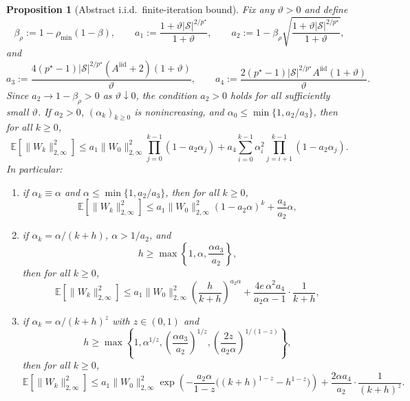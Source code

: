 \documentclass{article}
\newtheorem{proposition}[theorem]{Proposition}
\newcommand{\X}{\mathcal{S}}
\begin{document}
\begin{proposition}[Abstract i.i.d.\ finite-iteration bound]
\label{prop:abstract-iid}
Fix any $\vartheta > 0$ and define
\begin{equation}
\beta_{\rho} := 1 - \rho_{\min}(1-\beta), \qquad a_1 := \frac{1 + \vartheta \lvert \X \rvert^{2/p^\star}}{1+\vartheta}, \qquad a_2 := 1 - \beta_{\rho}\sqrt{\frac{1 + \vartheta \lvert \X \rvert^{2/p^\star}}{1+\vartheta}},
\end{equation}
and
\begin{equation}
a_3 := \frac{4(p^\star-1)\lvert \X \rvert^{2/p^\star}(A^{\mathrm{iid}}+2)(1+\vartheta)}{\vartheta}, \qquad a_4 := \frac{2(p^\star-1)\lvert \X \rvert^{2/p^\star}A^{\mathrm{iid}}(1+\vartheta)}{\vartheta}.
\end{equation}
Since $a_2 \to 1-\beta_{\rho}>0$ as $\vartheta\downarrow 0$, the condition $a_2 >0$ holds for all sufficiently small $\vartheta$. If $a_2 > 0$, $(\alpha_k)_{k \ge 0}$ is nonincreasing, and $\alpha_0 \le \min\{1,a_2/a_3\}$, then for all $k \ge 0$,
\begin{equation}
\mathbb{E}\left[\lVert W_k \rVert_{2,\infty}^2\right] \le a_1 \lVert W_0 \rVert_{2,\infty}^2 \prod_{j=0}^{k-1}(1-a_2\alpha_j) + a_4 \sum_{i=0}^{k-1} \alpha_i^2 \prod_{j=i+1}^{k-1}(1-a_2\alpha_j).
\end{equation}
In particular:
\begin{enumerate}
\item if $\alpha_k \equiv \alpha$ and $\alpha \le \min\{1,a_2/a_3\}$, then for all $k \ge 0$,
\begin{equation}
\mathbb{E}\left[\lVert W_k \rVert_{2,\infty}^2\right] \le a_1 \lVert W_0 \rVert_{2,\infty}^2 (1-a_2\alpha)^k + \frac{a_4}{a_2}\alpha,
\end{equation}

\item if $\alpha_k = \alpha/(k+h)$, $\alpha > 1/a_2$, and
\begin{equation}
h \ge \max\left\{1,\alpha,\frac{\alpha a_3}{a_2}\right\},
\end{equation}
then for all $k \ge 0$,
\begin{equation}
\mathbb{E}\left[\lVert W_k \rVert_{2,\infty}^2\right] \le a_1 \lVert W_0 \rVert_{2,\infty}^2 \left(\frac{h}{k+h}\right)^{a_2\alpha} + \frac{4e\,\alpha^2 a_4}{a_2\alpha-1}\cdot \frac{1}{k+h},
\end{equation}

\item if $\alpha_k = \alpha/(k+h)^z$ with $z \in (0,1)$ and
\begin{equation}
h \ge \max\left\{1,\alpha^{1/z}, \left(\frac{\alpha a_3}{a_2}\right)^{1/z}, \left(\frac{2z}{a_2\alpha}\right)^{1/(1-z)} \right\},
\end{equation}
then for all $k \ge 0$,
\begin{equation}
\mathbb{E}\left[\lVert W_k \rVert_{2,\infty}^2\right] \le a_1 \lVert W_0 \rVert_{2,\infty}^2 \exp\left(-\frac{a_2\alpha}{1-z}\bigl((k+h)^{1-z} - h^{1-z}\bigr)\right) + \frac{2\alpha a_4}{a_2}\cdot \frac{1}{(k+h)^z}.
\end{equation}
\end{enumerate}
\end{proposition}
\end{document}
